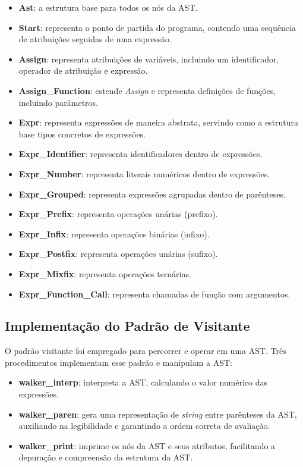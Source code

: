 \documentclass[english, 
               brazil, 
               bsc] %
               {dcomp-abntex2}
\begin{document}
\begin{itemize}
\item \textbf{Ast}: a estrutura base para todos os nós da AST.
\item \textbf{Start}: representa o ponto de partida do programa, contendo uma sequência de atribuições seguidas de uma expressão.
\item \textbf{Assign}: representa atribuições de variáveis, incluindo um identificador, operador de atribuição e expressão.
\item \textbf{Assign\_Function}: estende \textit{Assign} e representa definições de funções, incluindo parâmetros.
\item \textbf{Expr}: representa expressões de maneira abstrata, servindo como a estrutura base tipos concretos de expressões.
\item \textbf{Expr\_Identifier}: representa identificadores dentro de expressões.
\item \textbf{Expr\_Number}: representa literais numéricos dentro de expressões.
\item \textbf{Expr\_Grouped}: representa expressões agrupadas dentro de parênteses.
\item \textbf{Expr\_Prefix}: representa operações unárias (prefixo).
\item \textbf{Expr\_Infix}: representa operações binárias (infixo).
\item \textbf{Expr\_Postfix}: representa operações unárias (sufixo).
\item \textbf{Expr\_Mixfix}: representa operações ternárias.
\item \textbf{Expr\_Function\_Call}: representa chamadas de função com argumentos.


\end{itemize}


\subsection{Implementação do Padrão de Visitante}


O padrão visitante foi empregado para percorrer e operar em uma AST. Três procedimentos implementam esse padrão e manipulam a AST:


\begin{itemize}
  \item \textbf{walker\_interp}: interpreta a AST, calculando o valor numérico das expressões.
  \item \textbf{walker\_paren}: gera uma representação de \textit{string} entre parênteses da AST, auxiliando na legibilidade e garantindo a ordem correta de avaliação.
  \item \textbf{walker\_print}: imprime os nós da AST e seus atributos, facilitando a depuração e compreensão da estrutura da AST.
\end{itemize}
\end{document}

